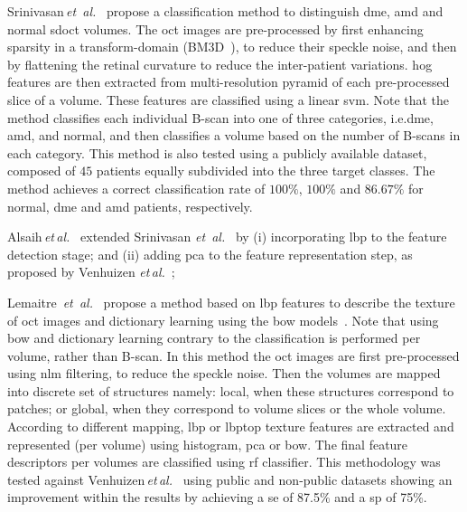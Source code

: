 %
Srinivasan\,\textit{et~al.}~\cite{Srinivasan2014} propose a classification method to distinguish \gls{dme}, \gls{amd} and normal \gls{sdoct} volumes.
%
The \gls{oct} images are pre-processed by first enhancing sparsity in a transform-domain (BM3D~\cite{dabov2007image}), to reduce their speckle noise, and then by flattening the retinal curvature to reduce the inter-patient variations.
\gls{hog} features are then extracted from multi-resolution pyramid of each pre-processed slice of a volume.
These features are classified using a linear \gls{svm}.
Note that the method classifies each individual B-scan into one of three categories, i.e.\gls{dme}, \gls{amd}, and normal, and then classifies a volume based on the number of B-scans in each category.
%
This method is also tested using a publicly available dataset, composed of $45$ patients equally subdivided into the three target classes.
The method achieves a correct classification rate of $100 \%$, $100 \%$ and $86.67 \%$ for normal, \gls{dme} and \gls{amd} patients, respectively.

Alsaih\,\emph{et\,al.}~\cite{Alsaih2016apr-repoICPR} extended Srinivasan \textit{et~al.}~\cite{Srinivasan2014} by
(i) incorporating \gls{lbp} to the feature detection stage;
and (ii) adding \gls{pca} to the feature representation step, as proposed by Venhuizen \textit{et\,al.}~\cite{Venhuizen2015};

Lemaitre~\emph{et~al.}~\cite{Lemaintre2015miccaiOCT} propose a method based on \gls{lbp} features to describe the texture of \gls{oct} images and dictionary learning using the \gls{bow} models~\cite{Sivic2003}.
Note that using \gls{bow} and dictionary learning contrary to \cite{Srinivasan2014} the classification is performed per volume, rather than B-scan.
In this method the \gls{oct} images are first pre-processed using \gls{nlm} filtering, to reduce the speckle noise.
Then the volumes are mapped into discrete set of structures namely: local, when these structures correspond to patches; or global, when they correspond to volume slices or the whole volume.
According to different mapping, \gls{lbp} or \gls{lbptop} texture features are extracted and represented (per volume) using histogram, \gls{pca} or \gls{bow}.
The final feature descriptors per volumes are classified using \gls{rf} classifier.
This methodology was tested against Venhuizen\,\textit{et\,al.}~\cite{Venhuizen2015} using public and non-public datasets showing an improvement within the results by achieving a \gls{se} of 87.5\% and a \gls{sp} of 75\%.


